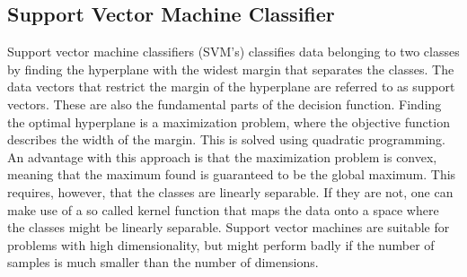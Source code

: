 \subsection{Support Vector Machine Classifier}
Support vector machine classifiers (SVM's) classifies data belonging to two classes by finding the hyperplane with the widest margin that separates the classes. The data vectors that restrict the margin of the hyperplane are referred to as support vectors. These are also the fundamental parts of the decision function. Finding the optimal hyperplane is a maximization problem, where the objective function describes the width of the margin. This is solved using quadratic programming. An advantage with this approach is that the maximization problem is convex, meaning that the maximum found is guaranteed to be the global maximum. This requires, however, that the classes are linearly separable. If they are not, one can make use of a so called kernel function that maps the data onto a space where the classes might be linearly separable. Support vector machines are suitable for problems with high dimensionality, but might perform badly if the number of samples is much smaller than the number of dimensions.